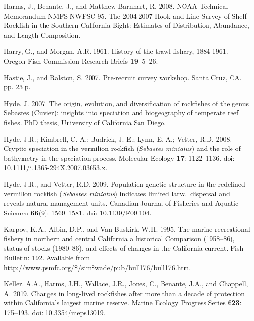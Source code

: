 \documentclass[11pt,
  english,
]{article}
\newlength{\cslhangindent}
\newenvironment{CSLReferences}[2] %
 {%
  \setlength{\parindent}{0pt}
  \ifodd #1 \everypar{\setlength{\hangindent}{\cslhangindent}}\ignorespaces\fi
  \ifnum #2 > 0
  \setlength{\parskip}{#2\baselineskip}
  \fi
 }%
 {}
\begin{document}
\begin{CSLReferences}{1}{0}
\leavevmode{}%
Harms, J., Benante, J., and Matthew Barnhart, R. 2008. {NOAA Technical Memorandum NMFS-NWFSC-95. The 2004-2007 Hook and Line Survey of Shelf Rockfish in the Southern California Bight: Estimates of Distribution, Abundance, and Length Composition}.

\leavevmode{}%
Harry, G., and Morgan, A.R. 1961. {History of the trawl fishery, 1884-1961}. Oregon Fish Commission Research Briefs \textbf{19}: 5--26.

\leavevmode{}%
Hastie, J., and Ralston, S. 2007. {Pre-recruit survey workshop}. Santa Cruz, CA. pp. 23 p.

\leavevmode{}%
Hyde, J. 2007. {The origin, evolution, and diversification of rockfishes of the genus Sebastes (Cuvier): insights into speciation and biogeography of temperate reef fishes}. PhD thesis, University of California San Diego.

\leavevmode{}%
Hyde, J.R.; Kimbrell, C. A.; Budrick, J. E.; Lynn, E. A.; Vetter, R.D. 2008. {Cryptic speciation in the vermilion rockfish (\emph{Sebastes miniatus}) and the role of bathymetry in the speciation process}. Molecular Ecology \textbf{17}: 1122--1136. doi: \href{https://doi.org/10.1111/j.1365-294X.2007.03653.x}{10.1111/j.1365-294X.2007.03653.x}.

\leavevmode{}%
Hyde, J.R., and Vetter, R.D. 2009. {Population genetic structure in the redefined vermilion rockfish (\emph{Sebastes miniatus}) indicates limited larval dispersal and reveals natural management units}. Canadian Journal of Fisheries and Aquatic Sciences \textbf{66}(9): 1569--1581. doi: \href{https://doi.org/10.1139/F09-104}{10.1139/F09-104}.

\leavevmode{}%
Karpov, K.A., Albin, D.P., and Van Buskirk, W.H. 1995. {The marine recreational fishery in northern and central California a historical Comparison (1958--86), status of stocks (1980--86), and effects of changes in the California current}. Fish Bulletin: 192. Available from \url{http://www.psmfc.org/$/sim$wade/pub/bull176/bull176.htm}.

\leavevmode{}%
Keller, A.A., Harms, J.H., Wallace, J.R., Jones, C., Benante, J.A., and Chappell, A. 2019. {Changes in long-lived rockfishes after more than a decade of protection within California's largest marine reserve}. Marine Ecology Progress Series \textbf{623}: 175--193. doi: \href{https://doi.org/10.3354/meps13019}{10.3354/meps13019}.


\end{CSLReferences}
\end{document}
